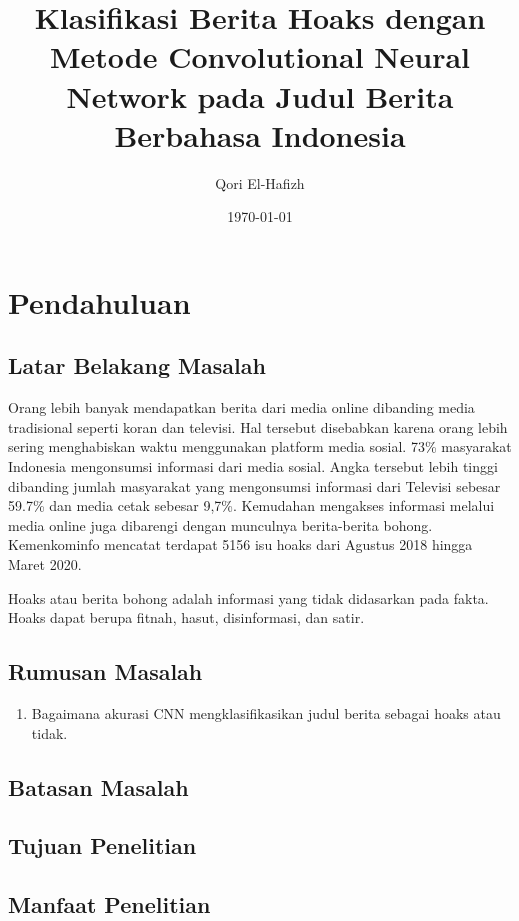 \documentclass[a4paper,12pt]{report}
\title{Klasifikasi Berita Hoaks dengan Metode Convolutional Neural Network pada Judul Berita Berbahasa Indonesia}
\author{Qori El-Hafizh}
\date{\today}
\begin{document}
\maketitle

\begin{abstract}
\end{abstract}

\tableofcontents

\chapter{Pendahuluan}
\section{Latar Belakang Masalah}
Orang lebih banyak mendapatkan berita dari media online dibanding media tradisional seperti koran dan televisi.
Hal tersebut disebabkan karena orang lebih sering menghabiskan waktu menggunakan platform media sosial.
73\% masyarakat Indonesia mengonsumsi informasi dari media sosial.
Angka tersebut lebih tinggi dibanding jumlah masyarakat yang mengonsumsi informasi dari Televisi sebesar 59.7\%
dan media cetak sebesar 9,7\%. \cite*{katadata_73_nodate}
Kemudahan mengakses informasi melalui media online juga dibarengi dengan munculnya berita-berita bohong.
Kemenkominfo mencatat terdapat 5156 isu hoaks dari Agustus 2018 hingga Maret 2020. \cite*{kominfo_detail_nodate}

Hoaks atau berita bohong adalah informasi yang tidak didasarkan pada fakta.
Hoaks dapat berupa fitnah, hasut, disinformasi, dan satir.
\section{Rumusan Masalah}
\begin{enumerate}
  \item Bagaimana akurasi CNN mengklasifikasikan judul berita sebagai hoaks atau tidak.
\end{enumerate}
\section{Batasan Masalah}
\section{Tujuan Penelitian}
\section{Manfaat Penelitian}
\end{document}
